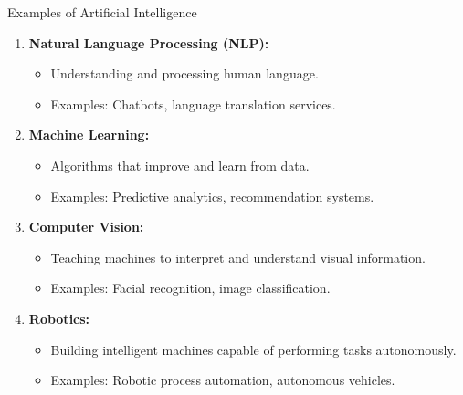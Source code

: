\begin{frame}{Examples of Artificial Intelligence}
  \begin{enumerate}
    \item \textbf{Natural Language Processing (NLP):}
      \begin{itemize}
        \item Understanding and processing human language.
        \item Examples: Chatbots, language translation services.
      \end{itemize}
    \item \textbf{Machine Learning:}
      \begin{itemize}
        \item Algorithms that improve and learn from data.
        \item Examples: Predictive analytics, recommendation systems.
      \end{itemize}
    \item \textbf{Computer Vision:}
      \begin{itemize}
        \item Teaching machines to interpret and understand visual information.
        \item Examples: Facial recognition, image classification.
      \end{itemize}
    \item \textbf{Robotics:}
      \begin{itemize}
        \item Building intelligent machines capable of performing tasks autonomously.
        \item Examples: Robotic process automation, autonomous vehicles.
      \end{itemize}
  \end{enumerate}
\end{frame}

